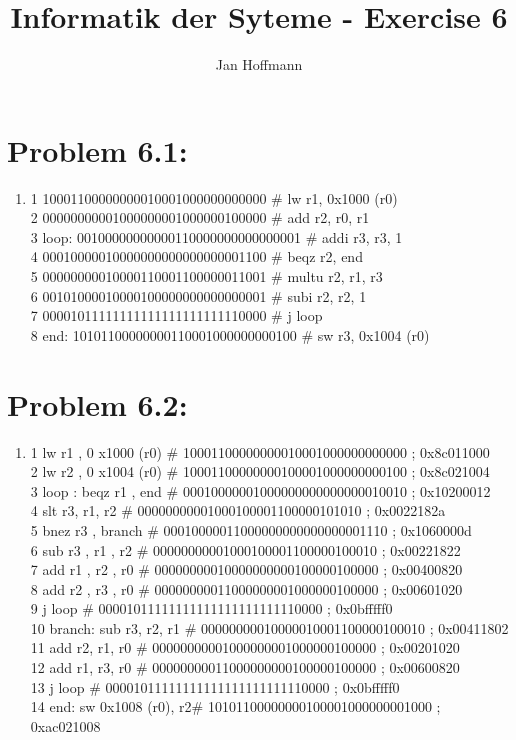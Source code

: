 \documentclass[10pt,a4paper]{article}
\title{Informatik der Syteme - Exercise 6}
\author{Jan Hoffmann}
\begin{document}
\section*{Problem 6.1:}
\begin{enumerate}
  \item 1       10001100000000010001000000000000 \# lw r1, 0x1000 (r0) \\
				2       00000000001000000001000000100000 \# add r2, r0, r1 \\
				3 loop: 00100000000000110000000000000001 \# addi r3, r3, 1 \\
				4       00010000010000000000000000001100 \# beqz r2, end \\
				5       00000000010000110001100000011001 \# multu r2, r1, r3 \\
				6       00101000010000100000000000000001 \# subi r2, r2, 1 \\
				7       00001011111111111111111111110000 \# j loop \\
				8	end:	10101100000000110001000000000100 \# sw r3, 0x1004 (r0) \\
				
 		
\end{enumerate}

\section*{Problem 6.2:}
\begin{enumerate}
	\item    1 lw r1 , 0 x1000 (r0)    \# 10001100000000010001000000000000 ; 0x8c011000 \\
					 2 lw r2 , 0 x1004 (r0)    \# 10001100000000100001000000000100 ; 0x8c021004 \\
					 3 loop : beqz r1 , end    \# 00010000001000000000000000010010 ; 0x10200012 \\
					 4 slt r3, r1, r2          \# 00000000001000100001100000101010 ; 0x0022182a \\
					 5 bnez r3 , branch        \# 00010000011000000000000000001110 ; 0x1060000d \\
					 6 sub r3 , r1 , r2        \# 00000000001000100001100000100010 ; 0x00221822 \\
					 7 add r1 , r2 , r0        \# 00000000010000000000100000100000 ; 0x00400820 \\
					 8 add r2 , r3 , r0        \# 00000000011000000001000000100000 ; 0x00601020 \\
					 9 j loop                  \# 00001011111111111111111111110000 ; 0x0bfffff0 \\
					 10 branch: sub r3, r2, r1 \# 00000000010000010001100000100010 ; 0x00411802 \\
					 11 add r2, r1, r0         \# 00000000001000000001000000100000 ; 0x00201020 \\
					 12 add r1, r3, r0         \# 00000000011000000000100000100000 ; 0x00600820 \\
					 13 j loop								 \# 00001011111111111111111111110000 ; 0x0bfffff0 \\
					 14 end: sw 0x1008 (r0), r2\# 10101100000000100001000000001000 ; 0xac021008 \\
\end{enumerate}
\end{document}
